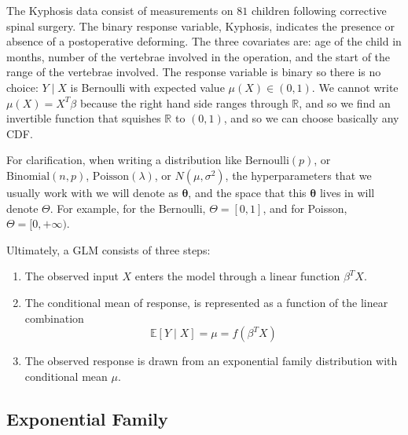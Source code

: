   \begin{example}
    The Kyphosis data consist of measurements on $81$ children following corrective spinal surgery. The binary response variable, Kyphosis, indicates the presence or absence of a postoperative deforming. The three covariates are: age of the child in months, number of the vertebrae involved in the operation, and the start of the range of the vertebrae involved. The response variable is binary so there is no choice: $Y \mid X$ is Bernoulli with expected value $\mu(X) \in (0, 1)$. We cannot write $\mu(X) = X^T \beta$ because the right hand side ranges through $\mathbb{R}$, and so we find an invertible function that squishes $\mathbb{R}$ to $(0, 1)$, and so we can choose basically any CDF. 
  \end{example}

  For clarification, when writing a distribution like $\mathrm{Bernoulli}(p)$, or $\mathrm{Binomial}(n, p)$, $\mathrm{Poisson}(\lambda)$, or $N(\mu, \sigma^2)$, the hyperparameters that we usually work with we will denote as $\boldsymbol{\theta}$, and the space that this $\boldsymbol{\theta}$ lives in will denote $\Theta$. For example, for the Bernoulli, $\Theta = [0, 1]$, and for Poisson, $\Theta = [0, +\infty)$. 

  Ultimately, a GLM consists of three steps: 
  \begin{enumerate}
    \item The observed input $X$ enters the model through a linear function $\beta^T X$. 
    \item The conditional mean of response, is represented as a function of the linear combination 
      \begin{equation}
        \mathbb{E}[Y \mid X] = \mu = f(\beta^T X)
      \end{equation}
    \item The observed response is drawn from an exponential family distribution with conditional mean $\mu$. 
  \end{enumerate}

\subsection{Exponential Family}

